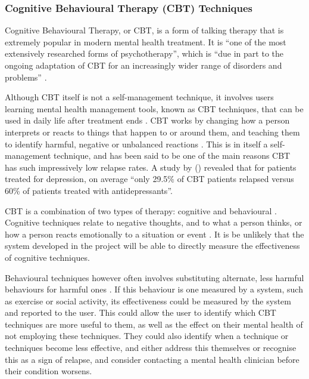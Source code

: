 \documentclass[11pt,openright,a4paper]{report}
\begin{document}
\subsubsection{Cognitive Behavioural Therapy (CBT) Techniques}
Cognitive Behavioural Therapy, or CBT, is a form of talking therapy that is extremely popular in modern mental health treatment. It is \enquote{one of the most extensively researched forms of psychotherapy}, which is \enquote{due in part to the ongoing adaptation of CBT for an increasingly
wider range of disorders and problems} \parencite{butler2006empirical}.

Although CBT itself is not a self-management technique, it involves users learning mental health management tools, known as CBT techniques, that can be used in daily life after treatment ends \parencite{babcpcbt}. CBT works by changing how a person interprets or reacts to things that happen to or around them, and teaching them to identify harmful, negative or unbalanced reactions \parencite{nhscbt}. This is in itself a self-management technique, and has been said to be one of the main reasons CBT has such impressively low relapse rates. A study by \citeauthor{butler2006empirical} (\citeyear{butler2006empirical}) revealed that for patients treated for depression, on average \enquote{only 29.5\% of CBT patients relapsed versus 60\% of patients treated with antidepressants}.

CBT is a combination of two types of therapy: cognitive and behavioural \parencite{patientcbt}. Cognitive techniques relate to negative thoughts, and to what a person thinks, or how a person reacts emotionally to a situation or event \parencite{medscapecbt}. It is be unlikely that the system developed in the project will be able to directly measure the effectiveness of cognitive techniques.

Behavioural techniques however often involves substituting alternate, less harmful behaviours for harmful ones \parencite{patientcbt}. If this behaviour is one measured by a system, such as exercise or social activity, its effectiveness could be measured by the system and reported to the user. This could allow the user to identify which CBT techniques are more useful to them, as well as the effect on their mental health of not employing these techniques. They could also identify when a technique or techniques become less effective, and either address this themselves or recognise this as a sign of relapse, and consider contacting a mental health clinician before their condition worsens.
\end{document}
